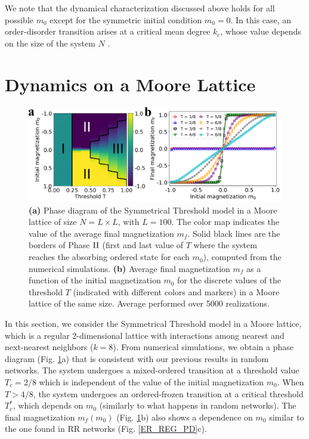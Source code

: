 We note that the dynamical characterization discussed above holds for all possible $m_0$ except for the symmetric initial condition $m_0 = 0$. In this case, an order-disorder transition arises at a critical mean degree $k_c$, whose value depends on the size of the system $N$ \cite{Konstantin}.

\section{\label{sec: Dynamics on a Moore Lattice}  Dynamics on a Moore Lattice}

\begin{figure}
		\centering \captionsetup{font=sf}
		\includegraphics[width=\textwidth]{Figs/Aging_STM/FIG9.pdf}
		\caption[Symmetrical Threshold model in a Moore lattice]{\label{LAT_PD} \textbf{(a)} Phase diagram of the Symmetrical Threshold model in a Moore lattice of size $N = L \times L$, with $L = 100$. The color map indicates the value of the average final magnetization $m_f$. Solid black lines are the borders of Phase ${\rm II}$ (first and last value of $T$ where the system reaches the absorbing ordered state for each $m_0$), computed from the numerical simulations. \textbf{(b)} Average final magnetization $m_f$ as a function of the initial magnetization $m_0$ for the discrete values of the threshold $T$ (indicated with different colors and markers) in a Moore lattice of the same size. Average performed over 5000 realizations.}
\end{figure}

In this section, we consider the Symmetrical Threshold model in a Moore lattice, which is a regular 2-dimensional lattice with interactions among nearest and next-nearest neighbors ($k=8$).  From numerical simulations, we obtain a phase diagram (Fig. \ref{LAT_PD}a) that is consistent with our previous results in random networks. The system undergoes a mixed-ordered transition at a threshold value $T_{c} = 2/8$  which is independent of the value of the initial magnetization $m_0$. When $T > 4/8$, the system undergoes an ordered-frozen transition at a critical threshold $T_{c}^{*}$, which depends on $m_0$ (similarly to what happens in random networks). The final magnetization $m_f(m_0)$ (Fig. \ref{LAT_PD}b) also shows a dependence on $m_0$ similar to the one found in RR networks (Fig. \ref{ER_REG_PD}c).

